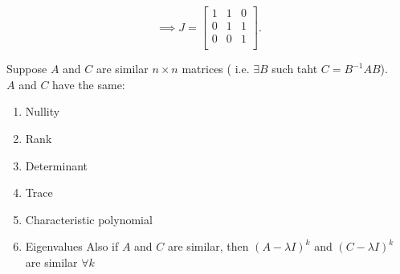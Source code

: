 \documentclass{report}
\begin{document}
{	    \[
	    \implies J = \begin{bmatrix}
	    1 & 1 & 0\\
	    0 & 1 & 1\\
	    0 & 0 & 1\\
	    \end{bmatrix}
	    .\] 
  }
  
    {
       Suppose $ A$ and $ C$ are similar $ n \times  n$ matrices ( i.e. $ \exists  B $ such taht $ C = B^{-1} A B$). \\
       $ A$ and $ C$ have the same:
       \begin{enumerate}[label=(\arabic*).]  
       \item Nullity
       \item Rank
       \item Determinant
	       \item  Trace
	       \item Characteristic polynomial
	       \item Eigenvalues 
		Also if $ A$ and $ C$ are similar, then $ \left( A - \lambda I  \right)^{k} $ and $ \left( C - \lambda I \right) ^{k} $ are similar $ \forall  k$
       \end{enumerate}
       
    }
\end{document}
